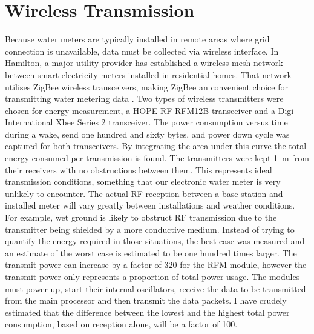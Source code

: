   \section{Wireless Transmission}

    Because water meters are typically installed in remote areas where grid connection is unavailable, data must be collected via wireless interface.
    In Hamilton, a major utility provider has established a wireless mesh network between smart electricity meters installed in residential homes.
    That network utilises ZigBee wireless transceivers, making ZigBee an convenient choice for transmitting water metering data \cite{MalcolmSouness-WELNetworks2012}.
    Two types of wireless transmitters were chosen for energy measurement, a HOPE RF RFM12B transceiver and a Digi International Xbee Series 2 transceiver.
    The power consumption versus time during a wake, send one hundred and sixty bytes, and power down cycle was captured for both transceivers.
    By integrating the area under this curve the total energy consumed per transmission is found.
    The transmitters were kept \SI{1}{\meter} from their receivers with no obstructions between them.
    This represents ideal transmission conditions, something that our electronic water meter is very unlikely to encounter.
    The actual RF reception between a base station and installed meter will vary greatly between installations and weather conditions.
    For example, wet ground is likely to obstruct RF transmission due to the transmitter being shielded by a more conductive medium.
    Instead of trying to quantify the energy required in those situations, the best case was measured and an estimate of the worst case is estimated to be one hundred times larger.
    The transmit power can increase by a factor of 320 for the RFM module, however the transmit power only represents a proportion of total power usage.
    The modules must power up, start their internal oscillators, receive the data to be transmitted from the main processor and then transmit the data packets.
    I have crudely estimated that the difference between the lowest and the highest total power consumption, based on reception alone, will be a factor of 100.

